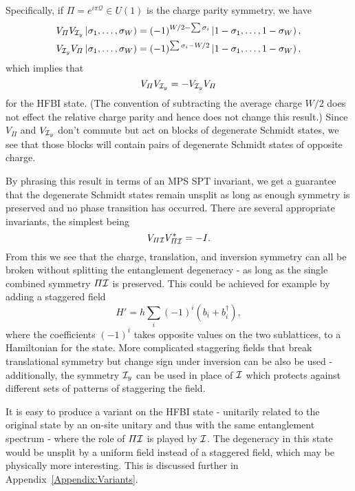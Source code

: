 Specifically, if $\varPi = e^{i \pi \mathcal{Q}} \in U(1)$ is the charge parity symmetry, we have
\begin{equation*}
\begin{split}
V_{\varPi} V_{\mathcal{I}_y}\left |\sigma_1, \ldots, \sigma_{W} \right ) &= (-1)^{W/2-\sum\sigma_i} \left |1-\sigma_1, \ldots, 1-\sigma_{W} \right ), \\
V_{\mathcal{I}_y} V_{\varPi} \left |\sigma_1, \ldots, \sigma_{W} \right ) &= (-1)^{\sum\sigma_i-W/2} \left |1-\sigma_1, \ldots, 1-\sigma_{W} \right ), \\
\end{split}
\end{equation*}
which implies that 
\begin{equation}
V_{\varPi} V_{\mathcal{I}_y} = - V_{\mathcal{I}_y} V_{\varPi}
\label{eq:hfbisym}
\end{equation}
for the HFBI state.
(The convention of subtracting the average charge $W/2$ does not effect the relative charge parity 
and hence does not change this result.)
Since $V_{\varPi}$ and $V_{\mathcal{I}_y}$ don't commute but act on blocks of degenerate Schmidt states,
we see that those blocks will contain pairs of degenerate Schmidt states of opposite charge.

By phrasing this result in terms of an MPS SPT invariant, we get a guarantee that the 
degenerate Schmidt states remain unsplit as long as enough symmetry is preserved and no phase 
transition has occurred. There are several appropriate invariants, the simplest being  
$$
V_{\varPi \mathcal{I}} V_{\varPi \mathcal{I}}^* = -I. 
$$
From this we see that the charge, translation, and inversion symmetry can all 
be broken without splitting the entanglement degeneracy - as long as the single combined symmetry
$\varPi \mathcal{I} $ is preserved. This could be achieved for example by adding a staggered field 
$$
H' = h \sum\limits_{i} (-1)^i \left(b_i + b_i^{\dagger}\right),
$$
where the coefficients $(-1)^i$ takes opposite values on the two sublattices, 
to a Hamiltonian for the state. More complicated staggering fields that break translational 
symmetry but change sign under inversion can be also be used - additionally, the symmetry $\mathcal{I}_y$ 
can be used in place of $\mathcal{I}$ which protects against different sets of patterns of staggering the 
field.

It is easy to produce a variant on the HFBI state - unitarily related to the original
state by an on-site unitary and thus with the same entanglement spectrum - where the role
of $\varPi \mathcal{I}$ is played by $\mathcal{I}$. The degeneracy in this state would be unsplit by a uniform
field instead of a staggered field, which may be physically more interesting. 
This is discussed further in Appendix~\ref{Appendix:Variants}.

